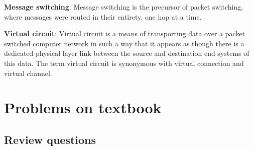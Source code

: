 \begin{enumerate}
	\qquad \textbf{Message switching}: Message switching is the precursor of packet switching, where messages were routed in their entirety, one hop at a time.
	
	\qquad \textbf{Virtual circuit}: Virtual circuit is a means of transporting data over a packet switched computer network in such a way that it appears as though there is a dedicated physical layer link between the source and destination end systems of this data. The term virtual circuit is synonymous with virtual connection and virtual channel.
\end{enumerate}

\section{Problems on textbook}
\subsection{Review questions}

